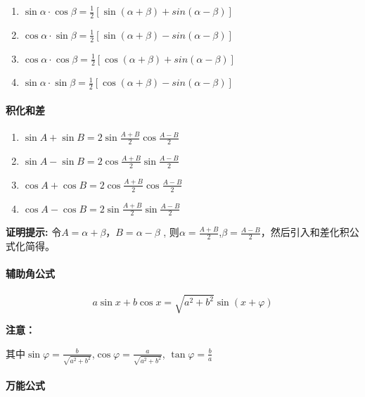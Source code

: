 \documentclass[
]{article}
\begin{document}
\begin{enumerate}
\def\labelenumi{\arabic{enumi}.}
\item
  \(\sin\alpha \cdot \cos\beta = \frac{1}{2}[\sin(\alpha+\beta)+sin(\alpha-\beta)]\)
\item
  \(\cos\alpha \cdot \sin\beta = \frac{1}{2}[\sin(\alpha+\beta)-sin(\alpha-\beta)]\)
\item
  \(\cos\alpha \cdot \cos\beta = \frac{1}{2}[\cos(\alpha+\beta)+sin(\alpha-\beta)]\)
\item
  \(\sin\alpha \cdot \sin\beta = \frac{1}{2}[\cos(\alpha+\beta)-sin(\alpha-\beta)]\)
\end{enumerate}

\hypertarget{ux79efux5316ux548cux5dee}{%
\paragraph{积化和差}\label{ux79efux5316ux548cux5dee}}

\begin{enumerate}
\def\labelenumi{\arabic{enumi}.}
\item
  \(\sin{A}+\sin{B} = 2\sin{\frac{A+B}{2}}\cos{\frac{A-B}{2}}\)
\item
  \(\sin{A}-\sin{B} = 2\cos{\frac{A+B}{2}}\sin{\frac{A-B}{2}}\)
\item
  \(\cos{A}+\cos{B} = 2\cos{\frac{A+B}{2}}\cos{\frac{A-B}{2}}\)
\item
  \(\cos{A}-\cos{B} = 2\sin{\frac{A+B}{2}}\sin{\frac{A-B}{2}}\)
\end{enumerate}

\textbf{证明提示:} 令\(A=\alpha+\beta\)，\(B = \alpha-\beta\) ,
则\(\alpha = \frac{A+B}{2}\),\(\beta = \frac{A-B}{2}\)，然后引入和差化积公式化简得。

\hypertarget{ux8f85ux52a9ux89d2ux516cux5f0f}{%
\paragraph{辅助角公式}\label{ux8f85ux52a9ux89d2ux516cux5f0f}}

\[a\sin x+b\cos x = \sqrt{a^2+b^2}\sin(x+\varphi)\]

\textbf{注意：}

其中\(\sin \varphi = \frac{b}{\sqrt{a^2+b^2}}\),\(\cos \varphi = \frac{a}{\sqrt{a^2+b^2}}\),
\(\tan \varphi = \frac{b}{a}\)

\hypertarget{ux4e07ux80fdux516cux5f0f}{%
\paragraph{万能公式}\label{ux4e07ux80fdux516cux5f0f}}
\end{document}
